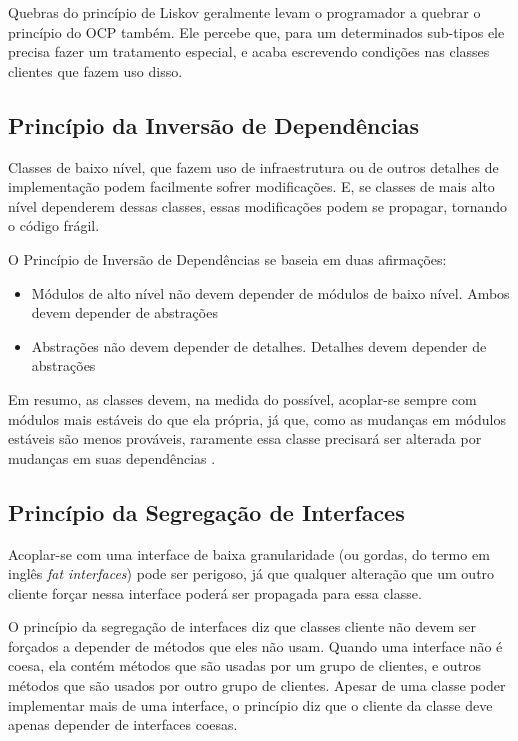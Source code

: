 Quebras do princípio de Liskov geralmente levam o programador a quebrar o
princípio do OCP também. Ele percebe que, para um determinados sub-tipos ele 
precisa fazer um tratamento especial, e acaba escrevendo condições nas classes 
clientes que fazem uso disso.

\subsection{Princípio da Inversão de Dependências}
\label{subsec:dip}

Classes de baixo nível, que fazem uso de infraestrutura ou de outros detalhes
de implementação podem facilmente sofrer modificações. E, se classes de mais alto
nível dependerem dessas classes, essas modificações podem se propagar, tornando
o código frágil.

O Princípio de Inversão de Dependências se baseia em duas afirmações:

\begin{itemize}
	\item Módulos de alto nível não devem depender de módulos de baixo nível. 
	Ambos devem depender de abstrações
	\item Abstrações não devem depender de detalhes. Detalhes devem depender de
	abstrações
\end{itemize}

Em resumo, as classes devem, na medida do possível, acoplar-se sempre com módulos mais
estáveis do que ela própria, já que, como as mudanças em módulos estáveis são
menos prováveis, raramente essa classe precisará ser alterada por mudanças em
suas dependências \cite{bobmartin-oodmetrics}.

\subsection{Princípio da Segregação de Interfaces}
\label{subsec:isp}

Acoplar-se com uma interface de baixa granularidade (ou gordas, do termo
em inglês \textit{fat interfaces}) pode ser perigoso, já que qualquer alteração
que um outro cliente forçar nessa interface poderá ser propagada para essa
classe.

O princípio da segregação de interfaces diz que classes cliente não devem ser
forçados a depender de métodos que eles não usam. Quando uma interface não é
coesa, ela contém métodos que são usadas por um grupo de clientes, e outros 
métodos que são usados por outro grupo de clientes. Apesar de uma classe poder 
implementar mais de uma interface, o princípio diz que o cliente da classe deve
apenas depender de interfaces coesas.


